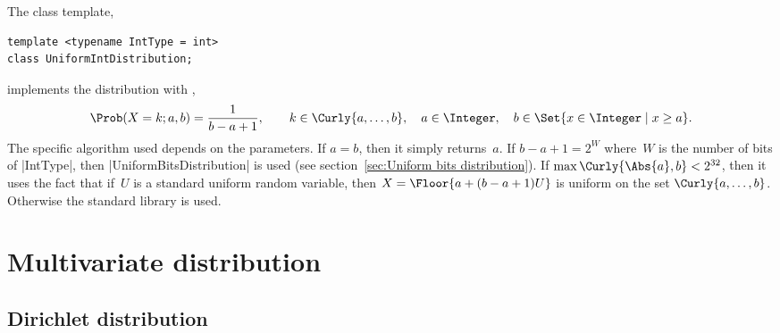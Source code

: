 The class template,
\begin{verbatim}
template <typename IntType = int>
class UniformIntDistribution;
\end{verbatim}
implements the distribution with \pdf,
\begin{equation*}
  \Prob(X = k;a,b) = \frac{1}{b - a + 1},\qquad
  k \in \Curly{a,\dots,b},\quad
  a \in \Integer,\quad b \in \Set{x \in \Integer \mid x \ge a}.
\end{equation*}
The specific algorithm used depends on the parameters. If $a = b$, then it
simply returns~$a$. If $b - a + 1 = 2^W$ where~$W$ is the number of bits of
|IntType|, then |UniformBitsDistribution| is used (see section~\ref{sec:Uniform
bits distribution}). If $\max\Curly{\Abs{a}, b} < 2^{32}$, then it uses the
fact that if~$U$ is a standard uniform random variable, then $X = \Floor{a + (b
  - a + 1) U}$ is uniform on the set $\Curly{a,\dots,b}$. Otherwise the
standard library is used.

\section{Multivariate distribution}
\label{sec:Multivariate distribution}

\subsection{Dirichlet distribution}
\label{sub:Dirichlet distribution}

